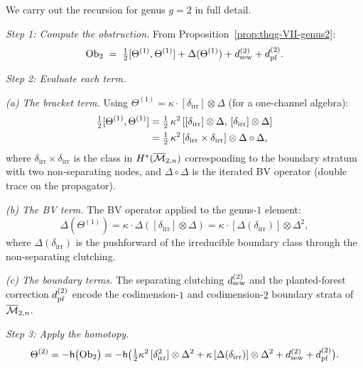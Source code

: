 \begin{computation}
We carry out the recursion for genus $g = 2$ in full detail.

\medskip\noindent\emph{Step 1: Compute the obstruction.}
From Proposition~\ref{prop:thqg-VII-genus2}:
\begin{equation}%
\Ob_2
\;=\;
\tfrac{1}{2}[\Theta^{(1)},\Theta^{(1)}]
+ \Delta(\Theta^{(1)})
+ \dsew^{(2)} + \dpf^{(2)}.
\end{equation}

\medskip\noindent\emph{Step 2: Evaluate each term.}

\emph{(a) The bracket term.} Using
$\Theta^{(1)} = \kappa \cdot [\delta_{\mathrm{irr}}]
\otimes \Delta$ (for a one-channel algebra):
\begin{align}
\tfrac{1}{2}[\Theta^{(1)},\Theta^{(1)}]
&= \tfrac{1}{2}\,\kappa^2\,
 [[\delta_{\mathrm{irr}}] \otimes \Delta,\,
 [\delta_{\mathrm{irr}}] \otimes \Delta]
\notag\\
&= \tfrac{1}{2}\,\kappa^2\,
 [\delta_{\mathrm{irr}} \times \delta_{\mathrm{irr}}]
 \otimes \Delta \circ \Delta,
\end{align}
where $\delta_{\mathrm{irr}} \times \delta_{\mathrm{irr}}$
is the class in $H^*(\overline{\mathcal{M}}_{2,n})$ corresponding to the
boundary stratum with two non-separating nodes, and
$\Delta \circ \Delta$ is the iterated BV operator (double
trace on the propagator).

\emph{(b) The BV term.} The BV operator applied to the genus-$1$
element:
\begin{equation}%
\Delta(\Theta^{(1)})
= \kappa \cdot \Delta([\delta_{\mathrm{irr}}] \otimes \Delta)
= \kappa \cdot [\Delta(\delta_{\mathrm{irr}})]
 \otimes \Delta^2,
\end{equation}
where $\Delta(\delta_{\mathrm{irr}})$ is the pushforward of
the irreducible boundary class through the non-separating
clutching.

\emph{(c) The boundary terms.} The separating clutching
$d_{\mathrm{sew}}^{(2)}$ and the planted-forest correction $d_{\mathrm{pf}}^{(2)}$
encode the codimension-$1$ and codimension-$2$ boundary strata
of $\overline{\mathcal{M}}_{2,n}$.

\medskip\noindent\emph{Step 3: Apply the homotopy.}
\begin{equation}%
\Theta^{(2)}
= -\hCont\bigl(\Ob_2\bigr)
= -\hCont\bigl(
 \tfrac{1}{2}\kappa^2\,
 [\delta_{\mathrm{irr}}^2] \otimes \Delta^2
 + \kappa\,[\Delta(\delta_{\mathrm{irr}})]
 \otimes \Delta^2
 + \dsew^{(2)} + \dpf^{(2)}
 \bigr).
\end{equation}


\end{computation}
